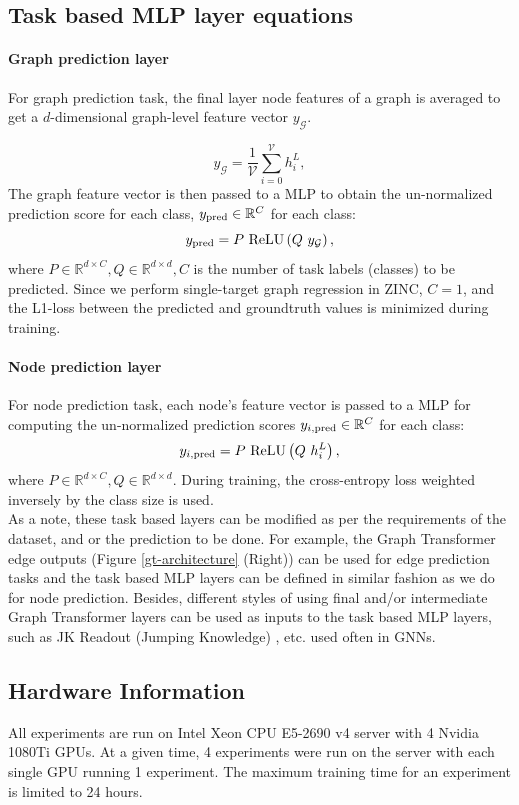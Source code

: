 \documentclass[letterpaper]{article} %
\begin{document}
\subsection{Task based MLP layer equations}


\paragraph{Graph prediction layer}
\label{sec:task_based_layers}
For graph prediction task, the final layer node features of a graph is averaged to get a $d$-dimensional graph-level feature vector $y_\mathcal{G}$.

\begin{equation}
    \label{eqn:graph-repres}
    y_\mathcal{G} =  \frac{1}{\mathcal{V}} \sum_{i=0}^{\mathcal{V}}{h_{i}^{L}},
\end{equation}
The graph feature vector is then passed to a MLP to obtain the un-normalized prediction score for each class, $y_\textnormal{pred}\in \mathbb{R}^C$ for each class:
\begin{equation}
    \label{eqn:graph_prediction}
    y_\textnormal{pred} = P \ \textnormal{ReLU} \left( Q \ y_\mathcal{G} \right),
\end{equation}
where $P \in \mathbb{R}^{d \times C}, Q \in \mathbb{R}^{d \times d}, C$ is the number of task labels (classes) to be predicted. 
Since we perform single-target graph regression in ZINC, $C=1$, and the L1-loss between the predicted and groundtruth values is minimized during training.

\paragraph{Node prediction layer}
For node prediction task, each node's feature vector is passed to a MLP for computing the un-normalized prediction scores $y_{i,\textnormal{pred}}\in \mathbb{R}^C$ for each class:
\begin{equation}
    \label{eqn:node_prediction}
    y_{i,\textnormal{pred}} = P \ \textnormal{ReLU} \left( Q \ h_{i}^{L} \right),
\end{equation}
where $P \in \mathbb{R}^{d \times C}, Q \in \mathbb{R}^{d \times d}$. During training, the cross-entropy loss weighted inversely by the class size is used.\\

As a note, these task based layers can be modified as per the requirements of the dataset, and or the prediction to be done. For example, the Graph Transformer edge outputs (Figure \ref{gt-architecture} (Right)) can be used for edge prediction tasks and the task based MLP layers can be defined in similar fashion as we do for node prediction. Besides, different styles of using final and/or intermediate Graph Transformer layers can be used as inputs to the task based MLP layers, such as JK Readout (Jumping Knowledge) \cite{xu2018representation}, etc. used often in GNNs.


\subsection{Hardware Information}
All experiments are run on Intel Xeon CPU E5-2690 v4 server with 4 Nvidia 1080Ti GPUs. At a given time, 4 experiments were run on the server with each single GPU running 1 experiment.
The maximum training time for an experiment is limited to 24 hours.
\end{document}
